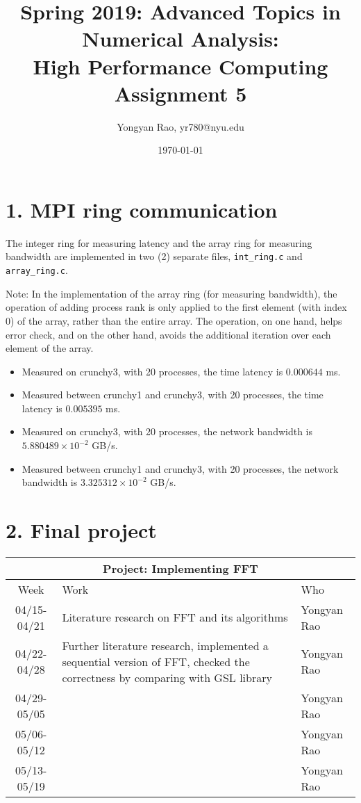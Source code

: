 \documentclass[amsmath,amssymb]{revtex4}
\begin{document}
\title{Spring 2019: Advanced Topics in Numerical Analysis:\\
High Performance Computing\\
Assignment 5}
\author{Yongyan Rao, yr780@nyu.edu}
\date{\today}
\maketitle


\section{\label{sec:sec1}1. MPI ring communication}
The integer ring for measuring latency and the array ring for measuring bandwidth are implemented in two (2) separate files, {\tt int\_ring.c} and {\tt array\_ring.c}.

Note: In the implementation of the array ring (for measuring bandwidth), the operation of adding process rank is only applied to the first element (with index 0) of the array, rather than the entire array. The operation, on one hand, helps error check, and on the other hand, avoids the additional iteration over each element of the array.
\begin{itemize}
\item Measured on crunchy3, with 20 processes, the time latency is $0.000644$ ms.
\item Measured between crunchy1 and crunchy3, with 20 processes, the time latency is $0.005395$ ms.
\item Measured on crunchy3, with 20 processes, the network bandwidth is $5.880489\times10^{-2}$ GB/s.
\item Measured between crunchy1 and crunchy3, with 20 processes, the network bandwidth is $3.325312\times10^{-2}$ GB/s.
\end{itemize}


\section{\label{sec:sec2}2. Final project}
\begin{center}
  \begin{tabular}{|c|p{10cm}|p{3cm}|}
    \hline
    \multicolumn{3}{|c|}{\bf Project: Implementing FFT} \\
    \hline
    Week & Work & Who  \\ \hline \hline
    04/15-04/21 & Literature research on FFT and its algorithms & Yongyan Rao \\ \hline
    04/22-04/28 & Further literature research, implemented a sequential version of FFT, checked the correctness by comparing with GSL library & Yongyan Rao \\ \hline
    04/29-05/05 &  & Yongyan Rao\\ \hline
    05/06-05/12 &  & Yongyan Rao \\ \hline
    05/13-05/19 &   & Yongyan Rao \\ \hline
  \end{tabular}
  \end{center}
\end{document}
